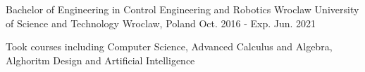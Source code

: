 
\begin{cventries}

  \cventry
    {Bachelor of Engineering in Control Engineering and Robotics} %
    {Wroclaw University of Science and Technology} %
    {Wroclaw, Poland} %
    {Oct. 2016 - Exp. Jun. 2021} %
    {
      \begin{cvitems} %
        \item {Took courses including Computer Science, Advanced Calculus and Algebra, Alghoritm Design and Artificial Intelligence}
      \end{cvitems}
    }

\end{cventries}
